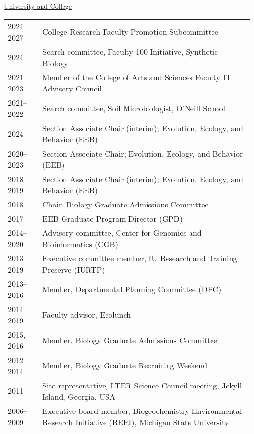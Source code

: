 \documentclass[11pt]{article}
\begin{document}
\vspace{-0.5em}
\textnormal{\underline{University and College}} \\[-2.5em]

\begin{longtable}{@{}p{4em}@{\hspace{2em}}p{}@{}}
2024--2027 & College Research Faculty Promotion Subcommittee \\
2024       & Search committee, Faculty 100 Initiative, Synthetic Biology \\
2021--2023 & Member of the College of Arts and Sciences Faculty IT Advisory Council \\
2021--2022 & Search committee, Soil Microbiologist, O’Neill School \\
2024       & Section Associate Chair (interim); Evolution, Ecology, and Behavior (EEB) \\
2020--2023 & Section Associate Chair; Evolution, Ecology, and Behavior (EEB) \\
2018--2019 & Section Associate Chair (interim); Evolution, Ecology, and Behavior (EEB) \\
2018       & Chair, Biology Graduate Admissions Committee \\
2017       & EEB Graduate Program Director (GPD) \\
2014--2020 & Advisory committee, Center for Genomics and Bioinformatics (CGB) \\
2013--2019 & Executive committee member, IU Research and Training Preserve (IURTP) \\
2013--2016 & Member, Departmental Planning Committee (DPC) \\
2014--2019 & Faculty advisor, Ecolunch \\
2015, 2016 & Member, Biology Graduate Admissions Committee \\
2012--2014 & Member, Biology Graduate Recruiting Weekend \\
2011       & Site representative, LTER Science Council meeting, Jekyll Island, Georgia, USA \\
2006--2009 & Executive board member, Biogeochemistry Environmental Research Initiative (BERI), Michigan State University \\
\end{longtable}
\end{document}

